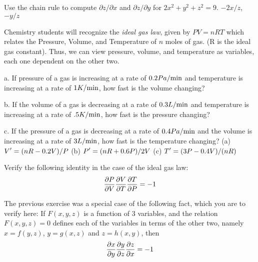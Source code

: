 \exercise Use the chain rule to compute $\partial z/\partial x$ and 
$\partial z/\partial y$ for $2x^2+y^2+z^2=9$.
\answer $-2x/z$, $-y/z$
\endanswer


\endexercise

\exercise Chemistry students will recognize the {\em ideal gas law\/}, given
  by $PV=nRT$ which relates the Pressure, Volume, and Temperature of
  $n$ moles of gas.  (R is the ideal gas constant).  Thus, we can view
  pressure, volume, and temperature as variables, each one dependent
  on the other two.

\beginlist
\item{a.} If pressure of a gas is increasing at a rate of $0.2
  Pa/\hbox{min}$ and temperature is increasing at a rate of $1
  K/\hbox{min}$, how fast is the volume changing?
\item{b.} If the volume of a gas is decreasing at a rate of $0.3
  L/\hbox{min}$ and temperature is increasing at a rate of $.5
  K/\hbox{min}$, how fast is the pressure changing?
\item{c.} If the pressure of a gas is decreasing at a rate of $0.4
  Pa/\hbox{min}$ and the volume is increasing at a rate of $3
  L/\hbox{min}$, how fast is the temperature changing?
\endlist
\answer (a) $\displaystyle V'=(nR-0.2V)/P$\hfill\break
(b) $\displaystyle P'=(nR+0.6P)/2V$\hfill\break
(c) $\displaystyle T' = (3P-0.4V)/(nR)$
\endanswer
\endexercise

\exercise Verify the following identity in the case of the ideal gas law:
$${\partial P\over \partial V} {\partial V\over \partial T} 
{\partial T\over \partial P}=-1$$
\endexercise

\exercise The previous exercise was a special case of the following
fact, which you are to verify here: If $F(x,y,z)$ is a function of 3
variables, and the relation $F(x,y,z)=0$ defines each of the variables
in terms of the other two, namely $x=f(y,z)$, $y=g(x,z)$ and
$z=h(x,y)$, then
$${\partial x\over \partial y} {\partial y\over \partial z} 
{\partial z\over \partial x}=-1$$
\endexercise

\endexercises

